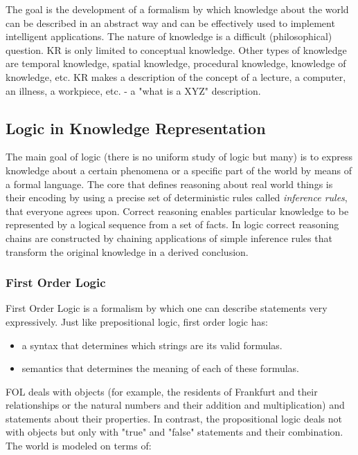 The goal is the development of a formalism by which knowledge about the world can be described in an abstract way and can be effectively used to implement intelligent applications. The nature of knowledge is a difficult (philosophical) question. KR is only limited to conceptual knowledge. Other types of knowledge are temporal knowledge, spatial knowledge, procedural knowledge, knowledge of knowledge, etc. KR makes a description of the concept of a lecture, a computer, an illness, a workpiece, etc. - a "what is a XYZ" description.

\subsection{Logic in Knowledge Representation}
The main goal of logic (there is no uniform study of logic but many) is to express knowledge about a certain phenomena or a specific part of the world by means of a formal language. The core that defines reasoning about real world things is their encoding by using a precise set of deterministic rules called \textit{inference rules}, that everyone agrees upon. Correct reasoning enables particular knowledge to be represented by a logical sequence from a set of facts. In logic correct reasoning chains are constructed by chaining applications of simple inference rules that transform the original knowledge in a derived conclusion. 

\subsubsection{First Order Logic}
First Order Logic is a formalism by which one can describe statements very expressively. Just like prepositional logic, first order logic has:

\begin{itemize}
    \item a syntax that determines which strings are its valid formulas.
    \item semantics that determines the meaning of each of these formulas.
\end{itemize}

FOL deals with objects (for example, the residents of Frankfurt and their relationships or the natural numbers and their addition and multiplication) and statements about their properties. In contrast, the propositional logic deals not with objects but only with "true" and "false" statements and their combination.
The world is modeled on terms of:

